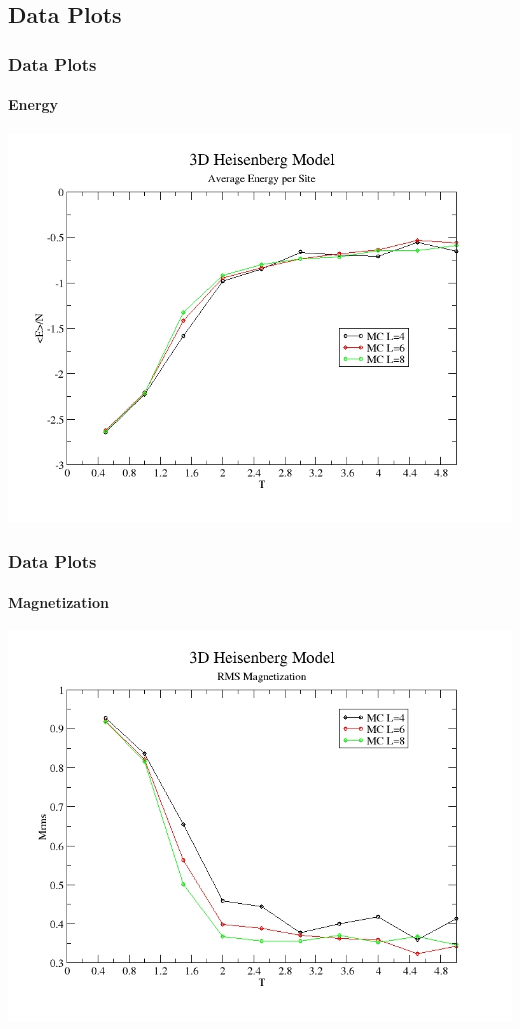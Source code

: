 \documentclass{beamer}
\begin{document}
  \subsection{Data Plots}
  \begin{frame}
    \frametitle{Data Plots}
    \framesubtitle{Energy}
    \center \includegraphics[scale=0.3]{e}
  \end{frame}
  \begin{frame}
  	\frametitle{Data Plots}
    \framesubtitle{Magnetization}
    \center \includegraphics[scale=0.3]{m}
  \end{frame}
\end{document}
